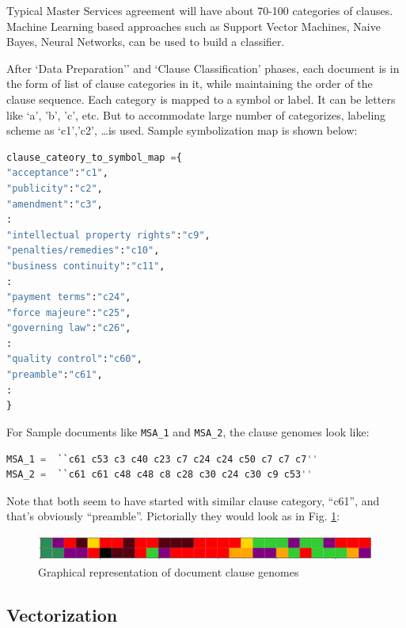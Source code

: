 \documentclass[9pt,academicons]{article}
\begin{document}
Typical Master Services agreement will have about 70-100 categories of clauses. Machine Learning based approaches such as Support Vector Machines, Naive Bayes, Neural Networks, can be used to build a classifier. 

After `Data Preparation'' and `Clause Classification' phases, each document is in the form of list of clause categories in it, while maintaining the order of the clause sequence. Each category is mapped to a symbol or label. It can be letters like `a', 'b', 'c', etc. But to accommodate large number of categorizes, labeling scheme as `c1','c2', \ldots is used. Sample symbolization map is shown below:

\begin{lstlisting}[language=Python, basicstyle=\footnotesize ]
clause_cateory_to_symbol_map ={ 
"acceptance":"c1", 
"publicity":"c2", 
"amendment":"c3", 
:
"intellectual property rights":"c9", 
"penalties/remedies":"c10", 
"business continuity":"c11", 
:
"payment terms":"c24", 
"force majeure":"c25", 
"governing law":"c26", 
:
"quality control":"c60", 
"preamble":"c61", 
:
}
\end{lstlisting}

For Sample documents like \lstinline|MSA_1| and \lstinline|MSA_2|, the clause genomes look like:
\begin{lstlisting}[language=Python, basicstyle=\footnotesize ]
MSA_1 =  ``c61 c53 c3 c40 c23 c7 c24 c24 c50 c7 c7 c7''
MSA_2 =  ``c61 c61 c48 c48 c8 c28 c30 c24 c30 c9 c53''
\end{lstlisting}

Note that both seem to have started with similar clause category, ``c61'', and that's obviously ``preamble''. Pictorially they would look as in Fig. \ref{fig:docclausegenome}:

 \begin{figure}[h!]
 \begin{center}
  \includegraphics[width=\linewidth,keepaspectratio]{img/two_genomes.png}
  \caption{Graphical representation of document clause genomes}
  \label{fig:docclausegenome}
 \end{center}
 \end{figure}


\subsection{Vectorization}
\label{subsec:vecrtorization}
\end{document}
